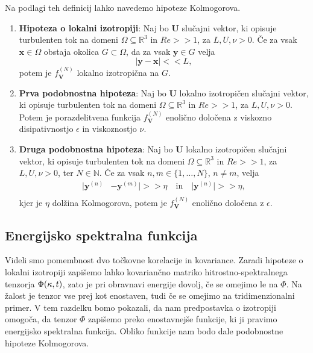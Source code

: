 \documentclass[mat2, tisk]{fmfdelo}
\newcommand{\R}{\mathbb R}
\newcommand{\N}{\mathbb N}
\newcommand{\bd}{\textbf}
\begin{document}
Na podlagi teh definicij lahko navedemo hipoteze Kolmogorova.

\begin{enumerate}
  \item[i)] \textbf{Hipoteza o lokalni izotropiji}: Naj bo $\bd{U}$ slučajni vektor,
  ki opisuje turbulenten tok na domeni $\Omega \subseteq \R^3$ in $Re >\!\!> 1$, za $L, U, \nu > 0$. Če 
  za vsak $\bd{x}\in \Omega$ obstaja okolica $G \subset \Omega$, da za vsak 
  $\bd{y}\in G$ velja $$ |\bd{y} - \bd{x}| <\!\!< L,$$ potem je $f_\bd{V}^{(N)}$ lokalno 
  izotropična na $G$.
  \item[ii)] \textbf{Prva podobnostna hipoteza}: Naj bo $\bd{U}$ lokalno izotropičen slučajni vektor,
  ki opisuje turbulenten tok na domeni $\Omega \subseteq \R^3$ in $Re >\!\!> 1$, za $L, U, \nu > 0$.
  Potem je porazdelitvena funkcija $f_\bd{V}^{(N)}$ enolično določena 
  z viskozno disipativnostjo $\epsilon$ in viskoznostjo $\nu$.
  \item[iii)] \textbf{Druga podobnostna hipoteza}: Naj bo $\bd{U}$ lokalno izotropičen slučajni vektor,
  ki opisuje turbulenten tok na domeni $\Omega \subseteq \R^3$ in $Re >\!\!> 1$, za $L, U, \nu > 0$, ter $N\in \N$.
  Če za vsak $n, m \in \{1, \dots, N\}$, $n\neq m$, velja 
  \begin{align*}
  |\bd{y}^{(n)} &- \bd{y}^{(m)}| >\!\!> \eta \,\,\,\,\text{ in } \,\,\,\,|\bd{y}^{(n)}|>\!\!> \eta, \\
\end{align*}
kjer je $\eta$ dolžina  Kolmogorova, potem je $f_\bd{V}^{(N)}$ enolično 
določena z $\epsilon$.
\end{enumerate}

\subsection{Energijsko spektralna funkcija}

Videli smo pomembnost dvo točkovne korelacije in kovariance. 
Zaradi hipoteze o lokalni izotropiji zapišemo lahko kovariančno matriko
hitrostno-spektralnega tenzorja $\Phi(\text{\bd{$\kappa$}}, t)$, zato je pri obravnavi energije 
dovolj, če se omejimo le na $\Phi$. 
Na žalost je tenzor vse prej kot enostaven, tudi če se omejimo na tridimenzionalni primer. V tem razdelku bomo pokazali, 
da nam predpostavka o izotropiji omogoča, da tenzor $\Phi$ zapišemo 
preko enostavnejše funkcije, ki ji pravimo energijsko spektralna funkcija.
Obliko funkcije nam bodo dale podobnostne hipoteze Kolmogorova. 
\end{document}
